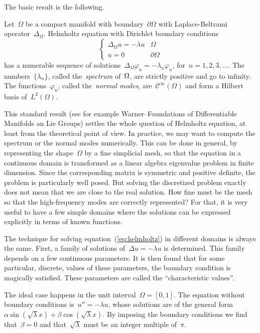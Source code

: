 The basic result is the following.

\begin{proposition}
	Let~$\Omega$ be a compact manifold with boundary~$\partial\Omega$
	with Laplace-Beltrami operator~$\Delta_\Omega$.  Helmholtz
	equation with Dirichlet boundary conditions
	\begin{equation}\label{eq:helmholtz}
		\begin{cases}
			\Delta_\Omega u = -\lambda u & \Omega \\
			u = 0 & \partial\Omega
		\end{cases}
	\end{equation}
	has a numerable sequence of
	solutions~$\Delta_\Omega\varphi_n=-\lambda_n\varphi_n$,
	for~$n=1,2,3,\ldots$.  The numbers~$\{\lambda_n\}$, called
	the~\emph{spectrum} of~$\/\Omega$, are strictly positive and go to
	infinity.  The functions~$\varphi_n$, called the~\emph{normal
	modes}, are~$\mathcal{C}^{\infty}(\Omega)$ and form a Hilbert
	basis of~$L^2(\Omega)$.
\end{proposition}

This standard result (see for example Warner--Foundations of Differentiable
Manifolds an Lie Groups) settles the whole question of Helmholtz
equation, at least from the theoretical point of view.  In practice,
we may want to compute the spectrum or the normal modes numerically.
This can be done in general, by representing the shape~$\Omega$ by a
fine simplicial mesh, so that the equation in a continuous domain is
transformed as a linear algebra eigenvalue problem in finite
dimension.  Since the corresponding matrix is symmetric and positive
definite, the problem is particularly well posed.  But solving the
discretized problem exactly does not mean that we are close to the
real solution.  How fine must be the mesh so that the high-frequency
modes are correctly represented?  For that, it is very useful to have
a few simple domains where the solutions can be expressed explicitly
in terms of known functions.

The technique for solving equation~(\ref{eq:helmholtz}) in different
domains is always the same.  First, a family of solutions of~$\Delta u
= -\lambda u$ is determined.  This family depends on a few continuous
parameters.  It is then found that for some particular, discrete,
values of these parameters, the boundary condition is magically
satisfied.  These parameters are called the ``characteristic
values''.

The ideal case happens in the unit interval~$\Omega=[0,1]$.  The
equation without boundary conditions is~$u''=-\lambda u$, whose
solutions are of the general form~$\alpha\sin(\sqrt{\lambda}x)+
\beta\cos(\sqrt{\lambda}x)$.  By imposing the boundary conditions we
find that~$\beta=0$ and that~$\sqrt{\lambda}$ must be an integer
multiple of~$\pi$.

